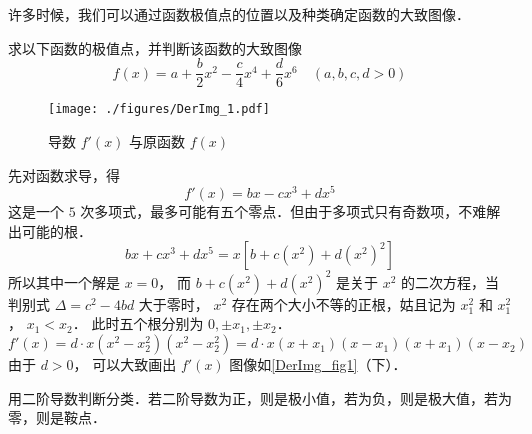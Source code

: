 
许多时候，我们可以通过函数极值点的位置以及种类确定函数的大致图像．

\begin{example}{}
求以下函数的极值点，并判断该函数的大致图像
\begin{equation}
f(x) = a + \frac{b}{2} x^2 - \frac{c}{4} x^4 + \frac{d}{6} x^6 \quad (a,b,c,d >0)
\end{equation}

\begin{figure}[ht]
\centering
\texttt{[image: ./figures/DerImg\_1.pdf]}
\caption{导数 $f'(x)$ 与原函数 $f(x)$}\label{DerImg_fig1}
\end{figure}

先对函数求导，得
\begin{equation}
f'(x) = bx - c x^3 + d x^5
\end{equation}
这是一个 $5$ 次多项式，最多可能有五个零点．但由于多项式只有奇数项，不难解出可能的根．
 \begin{equation}
bx + c x^3 + d x^5 = x[b + c(x^2) + d(x^2)^2 ]
\end{equation}
所以其中一个解是 $x = 0$， 而 $b + c(x^2) + d (x^2)^2$ 是关于 $x^2$ 的二次方程，当判别式 $\Delta  = c^2 - 4bd$ 大于零时， $x^2$ 存在两个大小不等的正根，姑且记为 $x_1^2$ 和 $x_1^2$， $x_1 < x_2$． 
此时五个根分别为 $0, \pm x_1, \pm x_2$． 
\begin{equation}
f'(x) = d \cdot x (x^2 - x_2^2) (x^2 - x_2^2) = d \cdot x (x + x_1)(x - x_1)(x + x_1)(x - x_2)
\end{equation} 
由于 $d > 0$， 可以大致画出 $f'(x)$ 图像如\autoref{DerImg_fig1}（下）．

用二阶导数判断分类．若二阶导数为正，则是极小值，若为负，则是极大值，若为零，则是鞍点．
\end{example}
